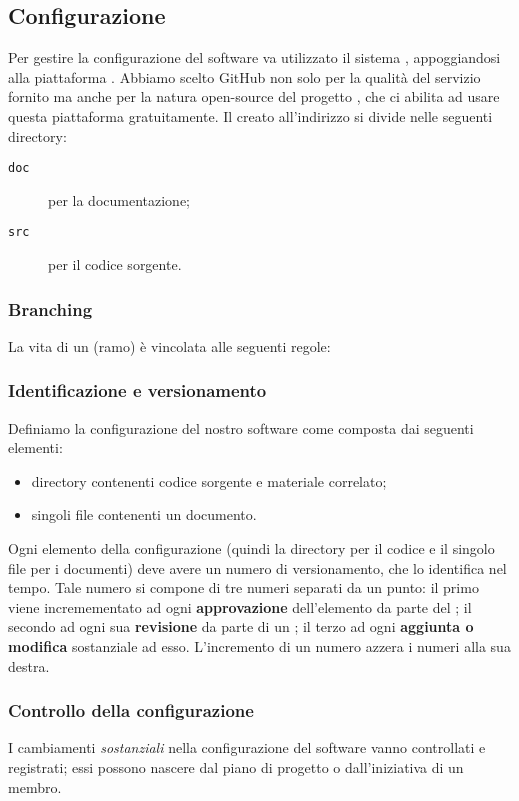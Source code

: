 \subsection{Configurazione} \label{sec:config}
Per gestire la configurazione del software va utilizzato il sistema , appoggiandosi alla piattaforma . Abbiamo scelto GitHub non solo per la qualità del servizio fornito ma anche per la natura open-source del progetto \proj, che ci abilita ad usare questa piattaforma gratuitamente. Il  creato all'indirizzo \repo{} si divide nelle seguenti directory:
\begin{description}
	\item[\texttt{doc}] per la documentazione;
	\item[\texttt{src}] per il codice sorgente.
\end{description}

\subsubsection{Branching} La vita di un  (ramo) è vincolata alle seguenti regole:
\subsubsection{Identificazione e versionamento} \label{sec:idvers}
Definiamo la configurazione del nostro software come composta dai seguenti elementi:
\begin{itemize}
	\item directory contenenti codice sorgente e materiale correlato;
	\item singoli file contenenti un documento.
\end{itemize}
Ogni elemento della configurazione (quindi la directory per il codice e il singolo file per i documenti) deve avere un numero di versionamento, che lo identifica nel tempo. Tale numero si compone di tre numeri separati da un punto: il primo viene incremementato ad ogni \textbf{approvazione} dell'elemento da parte del ; il secondo ad ogni sua \textbf{revisione} da parte di un ; il terzo ad ogni \textbf{aggiunta o modifica} sostanziale ad esso. L'incremento di un numero azzera i numeri alla sua destra.

\subsubsection{Controllo della configurazione} I cambiamenti \emph{sostanziali} nella configurazione del software vanno controllati e registrati; essi possono nascere dal piano di progetto o dall'iniziativa di un membro.
